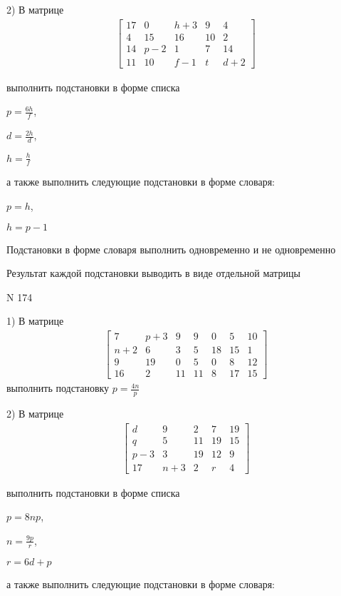 \documentclass[11pt]{report}
\begin{document}
    2) В матрице
\begin{align*}
\left[\begin{matrix}17 & 0 & h + 3 & 9 & 4\\4 & 15 & 16 & 10 & 2\\14 & p - 2 & 1 & 7 & 14\\11 & 10 & f - 1 & t & d + 2\end{matrix}\right]
\end{align*}

выполнить подстановки в форме списка

$p=\frac{6 h}{f}$,

$d=\frac{2 h}{d}$,

$h=\frac{h}{f}$

а также выполнить следующие подстановки в форме словаря:

$p=h$,

$h=p - 1$


    Подстановки в форме словаря выполнить одновременно и не одновременно


    Результат каждой подстановки выводить в виде отдельной матрицы

\newpage
N 174


    1) В матрице
\begin{align*}
\left[\begin{matrix}7 & p + 3 & 9 & 9 & 0 & 5 & 10\\n + 2 & 6 & 3 & 5 & 18 & 15 & 1\\9 & 19 & 0 & 5 & 0 & 8 & 12\\16 & 2 & 11 & 11 & 8 & 17 & 15\end{matrix}\right]
\end{align*}
выполнить подстановку $p=\frac{4 n}{p}$


    2) В матрице
\begin{align*}
\left[\begin{matrix}d & 9 & 2 & 7 & 19\\q & 5 & 11 & 19 & 15\\p - 3 & 3 & 19 & 12 & 9\\17 & n + 3 & 2 & r & 4\end{matrix}\right]
\end{align*}

выполнить подстановки в форме списка

$p=8 n p$,

$n=\frac{9 p}{r}$,

$r=6 d + p$

а также выполнить следующие подстановки в форме словаря:
\end{document}
